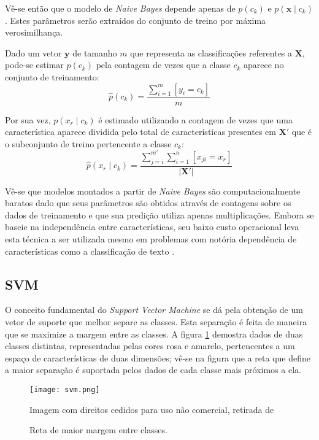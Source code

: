 Vê-se então que o modelo de \textit{Naive Bayes} depende apenas de $p(c_k)$ e $p(\mathbf{x} \mid c_k)$. Estes parâmetros serão extraídos do conjunto de treino por máxima verosimilhança.

Dado um vetor $\mathbf{y}$ de tamanho $m$ que representa as classificações referentes a $\mathbf{X}$, pode-se estimar $p(c_k)$ pela contagem de vezes que a classe $c_k$ aparece no conjunto de treinamento:
\begin{equation}
    \hat{p}(c_k) = \frac{\sum_{i=1}^m [y_i = c_k]}{m}
\end{equation}

Por sua vez, $p(x_r \mid c_k)$ é estimado utilizando a contagem de vezes que uma característica aparece dividida pelo total de características presentes em $\mathbf{X'}$ que é o subconjunto de treino pertencente a classe $c_k$:
\begin{equation}
    \hat{p}(x_r \mid c_k) = \frac{\sum_{j=i}^{m'} \sum_{i=1}^n [x_{ji} = x_r]}{|\mathbf{X'}|}
\end{equation}

Vê-se que modelos montados a partir de \textit{Naive Bayes} são computacionalmente baratos dado que seus parâmetros são obtidos através de contagens sobre os dados de treinamento e que sua predição utiliza apenas multiplicações.
Embora se baseie na independência entre características, seu baixo custo operacional leva esta técnica a ser utilizada mesmo em problemas com notória dependência de características como a classificação de texto \cite{mccallum98}.

\subsection{SVM}

O conceito fundamental do \textit{Support Vector Machine} se dá pela obtenção de um vetor de suporte que melhor separe as classes. Esta separação é feita de maneira que se maximize a margem entre as classes. A figura \ref{fig:svm} demostra dados de duas classes distintas, representadas pelas cores rosa e amarelo, pertencentes a um espaço de características de duas dimensões; vê-se na figura que a reta que define a maior separação é suportada pelos dados de cada classe mais próximos a ela.

\begin{figure}
\begin{center} {
    \begin{center}
    \texttt{[image: svm.png]}
    \caption{Reta de maior margem entre classes.}
    \small Imagem com direitos cedidos para uso não comercial, retirada de \cite{vanderplas15}
    \label{fig:svm}
    \end{center}
}
\end{center}
\end{figure}

